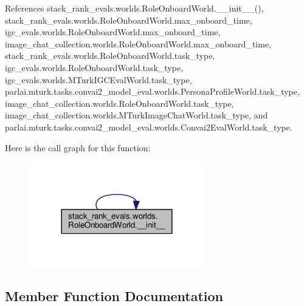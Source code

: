 References stack\+\_\+rank\+\_\+evals.\+worlds.\+Role\+Onboard\+World.\+\_\+\+\_\+init\+\_\+\+\_\+(), stack\+\_\+rank\+\_\+evals.\+worlds.\+Role\+Onboard\+World.\+max\+\_\+onboard\+\_\+time, igc\+\_\+evals.\+worlds.\+Role\+Onboard\+World.\+max\+\_\+onboard\+\_\+time, image\+\_\+chat\+\_\+collection.\+worlds.\+Role\+Onboard\+World.\+max\+\_\+onboard\+\_\+time, stack\+\_\+rank\+\_\+evals.\+worlds.\+Role\+Onboard\+World.\+task\+\_\+type, igc\+\_\+evals.\+worlds.\+Role\+Onboard\+World.\+task\+\_\+type, igc\+\_\+evals.\+worlds.\+M\+Turk\+I\+G\+C\+Eval\+World.\+task\+\_\+type, parlai.\+mturk.\+tasks.\+convai2\+\_\+model\+\_\+eval.\+worlds.\+Persona\+Profile\+World.\+task\+\_\+type, image\+\_\+chat\+\_\+collection.\+worlds.\+Role\+Onboard\+World.\+task\+\_\+type, image\+\_\+chat\+\_\+collection.\+worlds.\+M\+Turk\+Image\+Chat\+World.\+task\+\_\+type, and parlai.\+mturk.\+tasks.\+convai2\+\_\+model\+\_\+eval.\+worlds.\+Convai2\+Eval\+World.\+task\+\_\+type.

Here is the call graph for this function\+:
\nopagebreak
\begin{figure}[H]
\begin{center}
\leavevmode
\includegraphics[width=216pt]{classstack__rank__evals_1_1worlds_1_1RoleOnboardWorld_a93c85daae3056c33bc77b6159ce43b57_cgraph}
\end{center}
\end{figure}


\subsection{Member Function Documentation}
\mbox{\label{classstack__rank__evals_1_1worlds_1_1RoleOnboardWorld_ad01c1064fd3c5f1ac4746d043f47bfbc}} 
